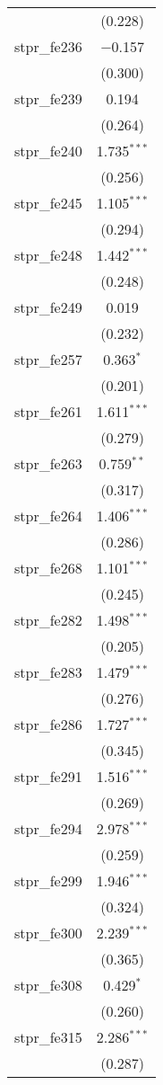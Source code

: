 \begin{table}[!htbp]
\begin{tabular}{@{\extracolsep{5pt}}lc}
  & (0.228) \\ 
  stpr\_fe236 & $-$0.157 \\ 
  & (0.300) \\ 
  stpr\_fe239 & 0.194 \\ 
  & (0.264) \\ 
  stpr\_fe240 & 1.735$^{***}$ \\ 
  & (0.256) \\ 
  stpr\_fe245 & 1.105$^{***}$ \\ 
  & (0.294) \\ 
  stpr\_fe248 & 1.442$^{***}$ \\ 
  & (0.248) \\ 
  stpr\_fe249 & 0.019 \\ 
  & (0.232) \\ 
  stpr\_fe257 & 0.363$^{*}$ \\ 
  & (0.201) \\ 
  stpr\_fe261 & 1.611$^{***}$ \\ 
  & (0.279) \\ 
  stpr\_fe263 & 0.759$^{**}$ \\ 
  & (0.317) \\ 
  stpr\_fe264 & 1.406$^{***}$ \\ 
  & (0.286) \\ 
  stpr\_fe268 & 1.101$^{***}$ \\ 
  & (0.245) \\ 
  stpr\_fe282 & 1.498$^{***}$ \\ 
  & (0.205) \\ 
  stpr\_fe283 & 1.479$^{***}$ \\ 
  & (0.276) \\ 
  stpr\_fe286 & 1.727$^{***}$ \\ 
  & (0.345) \\ 
  stpr\_fe291 & 1.516$^{***}$ \\ 
  & (0.269) \\ 
  stpr\_fe294 & 2.978$^{***}$ \\ 
  & (0.259) \\ 
  stpr\_fe299 & 1.946$^{***}$ \\ 
  & (0.324) \\ 
  stpr\_fe300 & 2.239$^{***}$ \\ 
  & (0.365) \\ 
  stpr\_fe308 & 0.429$^{*}$ \\ 
  & (0.260) \\ 
  stpr\_fe315 & 2.286$^{***}$ \\ 
  & (0.287) \\ 

\end{tabular}
\end{table}
